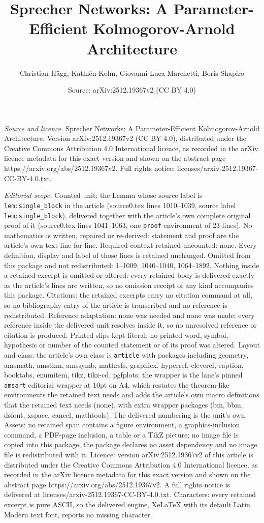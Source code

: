 \documentclass[10pt,a4paper]{amsart}
\title[Sprecher Networks: A Parameter-Efficient Kolmogorov-Arnold A]{Sprecher Networks: A Parameter-Efficient Kolmogorov-Arnold Architecture}
\author{Christian H\"agg, Kathl\'en Kohn, Giovanni Luca Marchetti, Boris Shapiro}
\date{Source: arXiv:2512.19367v2 (CC BY 4.0)}
\begin{document}
\maketitle

\noindent\emph{Source and licence.} Sprecher Networks: A Parameter-Efficient Kolmogorov-Arnold Architecture. Version arXiv:2512.19367v2 (CC BY 4.0), distributed under the Creative Commons Attribution 4.0 International licence, as recorded in the arXiv licence metadata for this exact version and shown on the abstract page https://arxiv.org/abs/2512.19367v2. Full rights notice: licenses/arxiv-2512.19367-CC-BY-4.0.txt.\par\smallskip

\noindent\textit{Editorial scope.} Counted unit: the Lemma whose source label is \texttt{lem:single\_block} in the article (source0.tex lines 1010--1039, source label \texttt{lem:single\_block}), delivered together with the article's own complete original proof of it (source0.tex lines 1041--1063, one \texttt{proof} environment of 23 lines). No mathematics is written, repaired or re-derived: statement and proof are the article's own text line for line. Required context retained uncounted: none. Every definition, display and label of those lines is retained unchanged. Omitted from this package and not redistributed: 1--1009, 1040--1040, 1064--1892. Nothing inside a retained excerpt is omitted or altered: every retained body is delivered exactly as the article's lines are written, so no omission receipt of any kind accompanies this package. Citations: the retained excerpts carry no citation command at all, so no bibliography entry of the article is transcribed and no reference is redistributed. Reference adaptation: none was needed and none was made; every reference inside the delivered unit resolves inside it, so no unresolved reference or citation is produced. Printed slips kept literal: no printed word, symbol, hypothesis or number of the counted statement or of its proof was altered. Layout and class: the article's own class is \texttt{article} with packages including geometry, amsmath, amsthm, amssymb, mathrsfs, graphicx, hyperref, cleveref, caption, booktabs, enumitem, tikz, tikz-cd, pgfplots; the wrapper is the lane's pinned \texttt{amsart} editorial wrapper at 10pt on A4, which restates the theorem-like environments the retained text needs and adds the article's own macro definitions that the retained text needs (none), with extra wrapper packages (bm, bbm, dsfont, xspace, cancel, mathtools). The delivered numbering is the unit's own. Assets: no retained span contains a figure environment, a graphics-inclusion command, a PDF-page inclusion, a table or a TikZ picture; no image file is copied into this package, the package declares no asset dependency and no image file is redistributed with it. Licence: version arXiv:2512.19367v2 of this article is distributed under the Creative Commons Attribution 4.0 International licence, as recorded in the arXiv licence metadata for this exact version and shown on the abstract page https://arxiv.org/abs/2512.19367v2. A full rights notice is delivered at licenses/arxiv-2512.19367-CC-BY-4.0.txt. Characters: every retained excerpt is pure ASCII, so the delivered engine, XeLaTeX with its default Latin Modern text font, reports no missing character.
\end{document}
